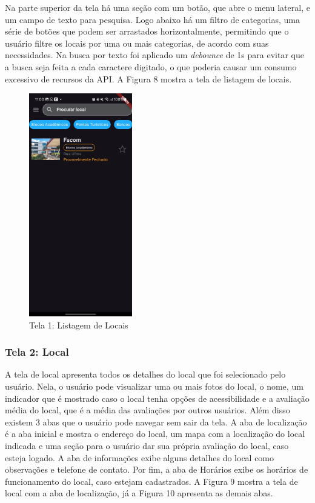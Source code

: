     Na parte superior da tela há uma seção com um botão, que abre o menu lateral, e um campo de texto para pesquisa. Logo abaixo há um filtro de categorias, uma série de botões que podem ser arrastados horizontalmente, permitindo que o usuário filtre os locais por uma ou mais categorias, de acordo com suas necessidades. Na busca por texto foi aplicado um \textit{debounce} de 1s para evitar que a busca seja feita a cada caractere digitado, o que poderia causar um consumo excessivo de recursos da API. A Figura 8 mostra a tela de listagem de locais.

    \begin{figure}[h]
        \centering
        \includegraphics[width=0.4\textwidth]{imagens/inicial.jpg}
        \caption{\scriptsize Tela 1: Listagem de Locais}
        \label{fig:tela1}
    \end{figure}

    \FloatBarrier

\subsubsection{Tela 2: Local}

    A tela de local apresenta todos os detalhes do local que foi selecionado pelo usuário. Nela, o usuário pode visualizar uma ou mais fotos do local, o nome, um indicador que é mostrado caso o local tenha opções de acessibilidade e a avaliação média do local, que é a média das avaliações por outros usuários. Além disso existem 3 abas que o usuário pode navegar sem sair da tela. A aba de localização é a aba inicial e mostra o endereço do local, um mapa com a localização do local indicada e uma seção para o usuário dar sua própria avaliação do local, caso esteja logado. A aba de informações exibe alguns detalhes do local como observações e telefone de contato. Por fim, a aba de Horários exibe os horários de funcionamento do local, caso estejam cadastrados. A Figura 9 mostra a tela de local com a aba de localização, já a Figura 10 apresenta as demais abas.

